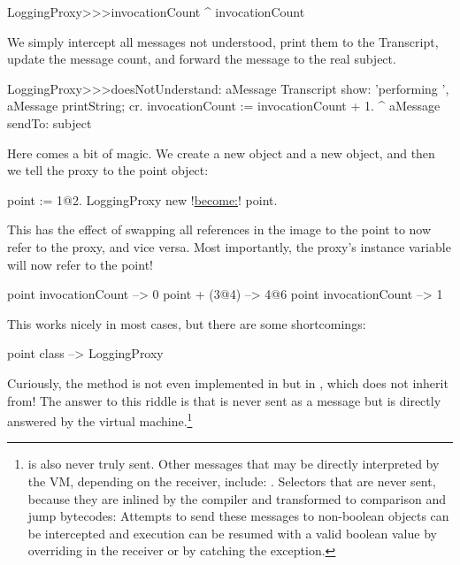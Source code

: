 \documentclass[a4paper,10pt,twoside]{book}
\begin{document}
\begin{code}{}
LoggingProxy>>>invocationCount
        ^ invocationCount
\end{code}

We simply intercept all messages not understood, print them to the Transcript, update the message count, and forward the message to the real subject.
\begin{code}{}
LoggingProxy>>>doesNotUnderstand: aMessage
        Transcript show: 'performing ', aMessage printString; cr.
        invocationCount := invocationCount + 1.
        ^ aMessage sendTo: subject
\end{code}

Here comes a bit of magic.
We create a new  object and a new  object, and then we tell the proxy to  the point object:
\begin{code}{}
point := 1@2.
LoggingProxy new !\underline{become:}! point.
\end{code}

This has the effect of swapping all references in the image to the point to now refer to the proxy, and vice versa. Most importantly, the proxy's  instance variable will now refer to the point!

\begin{code}{}
point invocationCount --> 0
point + (3@4)             --> 4@6
point invocationCount --> 1
\end{code}

This works nicely in most cases, but there are some shortcomings:
\begin{code}{}
point class --> LoggingProxy
\end{code}
Curiously, the method  is not even implemented in  but in , which  does not inherit from!
The answer to this riddle is that  is never sent as a message but is directly answered by the virtual machine.\footnote{ is also never truly sent.
Other messages that may be directly interpreted by the VM, depending on the receiver, include:
\ct{+- < > <= >= = ~= * / \ ==}
.
Selectors that are never sent, because they are inlined by the compiler and transformed to comparison and jump bytecodes:
Attempts to send these messages to non-boolean objects can be intercepted and execution can be resumed with a valid boolean value by overriding  in the receiver or by catching the  exception.
}%
\end{document}

